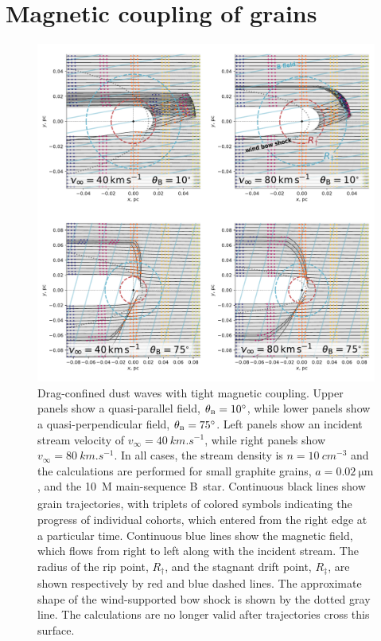 \section{Magnetic coupling of grains}
\label{sec:magn-effects-grain}

\begin{figure}
  \centering
  \includegraphics[width=\linewidth]{figs/frozen-stream-map-multi}
  \caption{Drag-confined dust waves with tight magnetic coupling.
    Upper panels show a quasi-parallel field, \(\theta_{\scriptscriptstyle\text{B}} = \ang{10}\),
    while lower panels show a quasi-perpendicular field,
    \(\theta_{\scriptscriptstyle\text{B}} = \ang{75}\).  Left panels show an incident stream velocity of
    \(v_\infty = \SI{40}{km.s^{-1}}\), while right panels show
    \(v_\infty = \SI{80}{km.s^{-1}}\).  In all cases, the stream density is
    \(n = \SI{10}{cm^{-3}}\) and the calculations are performed for
    small graphite grains, \(a = \SI{0.02}{\um}\), and the
    \SI{10}{M_\odot} main-sequence B~star.  Continuous black lines show
    grain trajectories, with triplets of colored symbols indicating
    the progress of individual cohorts, which entered from the right
    edge at a particular time.  Continuous blue lines show the
    magnetic field, which flows from right to left along with the
    incident stream.  The radius of the rip point, \(R_\dag\), and the
    stagnant drift point, \(R_\ddag\), are shown respectively by red and
    blue dashed lines.  The approximate shape of the wind-supported
    bow shock is shown by the dotted gray line.  The calculations are
    no longer valid after trajectories cross this surface.}
  \label{fig:frozen-stream}
\end{figure}

